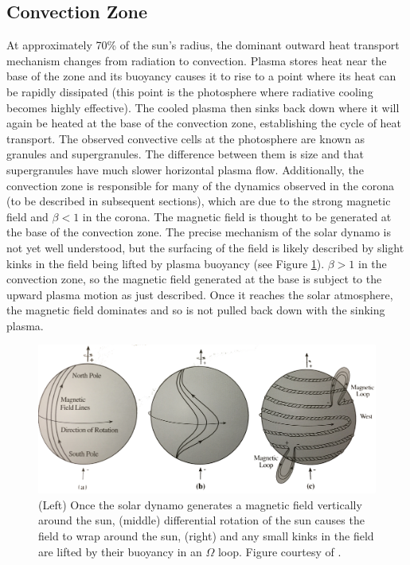 \subsection{Convection Zone}
At approximately 70\% of the sun's radius, the dominant outward heat transport mechanism changes from radiation to convection. Plasma stores heat near the base of the zone and its buoyancy causes it to rise to a point where its heat can be rapidly dissipated (this point is the photosphere where radiative cooling becomes highly effective). The cooled plasma then sinks back down where it will again be heated at the base of the convection zone, establishing the cycle of heat transport. The observed convective cells at the photosphere are known as granules and supergranules. The difference between them is size and that supergranules have much slower horizontal plasma flow. Additionally, the convection zone is responsible for many of the dynamics observed in the corona (to be described in subsequent sections), which are due to the strong magnetic field and $\beta < 1$ in the corona. The magnetic field is thought to be generated at the base of the convection zone. The precise mechanism of the solar dynamo is not yet well understood, but the surfacing of the field is likely described by slight kinks in the field being lifted by plasma buoyancy (see Figure \ref{fig:magfieldgeneration}). 
$\beta > 1$ in the convection zone, so the magnetic field generated at the base is subject to the upward plasma motion as just described. Once it reaches the solar atmosphere, the magnetic field dominates and so is not pulled back down with the sinking plasma. 

\begin{figure}[!h]
    \begin{center}
	    \includegraphics[width=\textwidth]{Images/MagneticFieldGeneration.png}
    \end{center}
    \caption[Surfacing of magnetic field]{
        (Left) Once the solar dynamo generates a magnetic field vertically around the sun, (middle) differential rotation 
        of the sun causes the field to wrap around the sun, (right) and any small kinks in the field are lifted by their 
        buoyancy in an $\Omega$ loop. Figure courtesy of \citet{Lang2001}.       
    }
    \label{fig:magfieldgeneration}
\end{figure}

